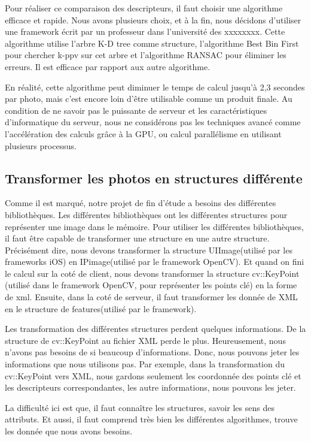 Pour réaliser ce comparaison des descripteurs, il faut choisir une algorithme efficace et rapide. Nous avons plusieurs choix, et à la fin, nous décidons d'utiliser une framework écrit par un professeur dans l'université des xxxxxxxx. Cette algorithme utilise l'arbre K-D tree comme structure, l'algorithme Best Bin First pour chercher k-ppv sur cet arbre et l'algorithme RANSAC pour éliminer les erreurs. Il est efficace par rapport aux autre algorithme.

En réalité, cette algorithme peut diminuer le temps de calcul jusqu'à 2,3 secondes par photo, mais c'est encore loin d'être utilisable comme un produit finale. Au condition de ne savoir pas le puissante de serveur et les caractéristiques d'informatique du serveur, nous ne considérons pas les techniques avancé comme l'accélération des calculs grâce à la GPU, ou calcul parallélisme en utilisant plusieurs processus.  



\subsection{Transformer les photos en structures différente} %
\label{sub:transformer_les_photos_en_structures_différente}

Comme il est marqué, notre projet de fin d'étude a besoins des différentes bibliothèques. Les différentes bibliothèques ont les différentes structures pour représenter une image dans le mémoire. Pour utiliser les différentes bibliothèques, il faut être capable de transformer une structure en une autre structure. Précisément dire, nous devons transformer la structure UIImage(utilisé par les frameworks iOS) en IPimage(utilisé par le framework OpenCV). Et quand on fini le calcul sur la coté de client, nous devons transformer la structure cv::KeyPoint (utilisé dans le framework OpenCV, pour représenter les points clé) en la forme de xml. Ensuite, dans la coté de serveur, il faut transformer les donnée de XML en le structure de features(utilisé par le framework).

Les transformation des différentes structures perdent quelques informations. De la structure de cv::KeyPoint au fichier XML perde le plus. Heureusement, nous n'avons pas besoins de si beaucoup d'informations. Donc, nous pouvons jeter les informations que nous utilisons pas. Par exemple, dans la transformation du cv::KeyPoint vers XML, nous gardons seulement les coordonnée des points clé et les descripteurs correspondantes, les autre informations, nous pouvons les jeter.

La difficulté ici est que, il faut connaître les structures, savoir les sens des attributs. Et aussi, il faut comprend très bien les différentes algorithmes, trouve les donnée que nous avons besoins.



